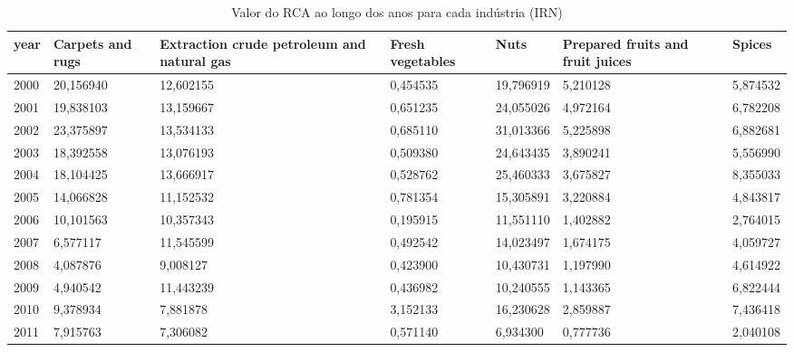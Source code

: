 \begin{table}
\centering
\caption{Valor do RCA ao longo dos anos para cada indústria (IRN)}
\begin{tabular}{p{1cm}p{2cm}p{2cm}p{2cm}p{2cm}p{2cm}p{2cm}}
\toprule
 year &  Carpets and rugs &  Extraction crude petroleum and natural gas &  Fresh vegetables &      Nuts &  Prepared fruits and fruit juices &   Spices \\
\midrule
 2000 &         20,156940 &                                   12,602155 &          0,454535 & 19,796919 &                          5,210128 & 5,874532 \\
 2001 &         19,838103 &                                   13,159667 &          0,651235 & 24,055026 &                          4,972164 & 6,782208 \\
 2002 &         23,375897 &                                   13,534133 &          0,685110 & 31,013366 &                          5,225898 & 6,882681 \\
 2003 &         18,392558 &                                   13,076193 &          0,509380 & 24,643435 &                          3,890241 & 5,556990 \\
 2004 &         18,104425 &                                   13,666917 &          0,528762 & 25,460333 &                          3,675827 & 8,355033 \\
 2005 &         14,066828 &                                   11,152532 &          0,781354 & 15,305891 &                          3,220884 & 4,843817 \\
 2006 &         10,101563 &                                   10,357343 &          0,195915 & 11,551110 &                          1,402882 & 2,764015 \\
 2007 &          6,577117 &                                   11,545599 &          0,492542 & 14,023497 &                          1,674175 & 4,059727 \\
 2008 &          4,087876 &                                    9,008127 &          0,423900 & 10,430731 &                          1,197990 & 4,614922 \\
 2009 &          4,940542 &                                   11,443239 &          0,436982 & 10,240555 &                          1,143365 & 6,822444 \\
 2010 &          9,378934 &                                    7,881878 &          3,152133 & 16,230628 &                          2,859887 & 7,436418 \\
 2011 &          7,915763 &                                    7,306082 &          0,571140 &  6,934300 &                          0,777736 & 2,040108 \\

\end{tabular}
\end{table}
